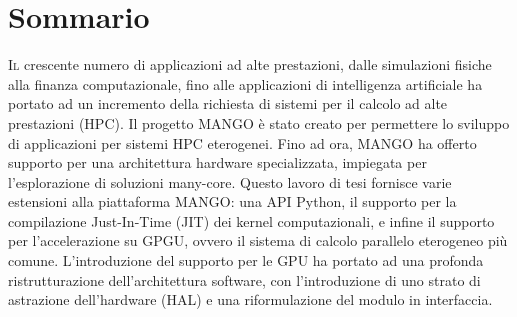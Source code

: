 \chapter*{Sommario}
\lettrine{I}{l} crescente numero di applicazioni ad alte prestazioni, dalle simulazioni fisiche alla finanza computazionale, fino alle applicazioni di intelligenza artificiale ha portato ad un incremento della richiesta di sistemi per il calcolo ad alte prestazioni (HPC). Il progetto MANGO è stato creato per permettere lo sviluppo di applicazioni per sistemi HPC eterogenei. Fino ad ora, MANGO ha offerto supporto per una architettura hardware specializzata, impiegata per l'esplorazione di soluzioni many-core. Questo lavoro di tesi fornisce varie estensioni alla piattaforma MANGO: una API Python, il supporto per la compilazione Just-In-Time (JIT) dei kernel computazionali, e infine il supporto per l'accelerazione su GPGU, ovvero il sistema di calcolo parallelo eterogeneo più comune. L'introduzione del supporto per le GPU ha portato ad una profonda ristrutturazione dell'architettura software, con l'introduzione di uno strato di astrazione dell'hardware (HAL) e una riformulazione del modulo in interfaccia.